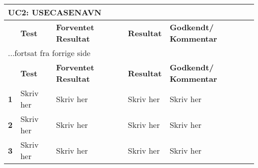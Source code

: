 \begin{center}
	\label{accepttest:uc2} 
\begin{longtable}{|p{}|p{}|p{}|p{}|p{}|} %
\hline
\multicolumn{5}{|l|}{\textbf{UC2: USECASENAVN}} \\ \hline
\multicolumn{1}{|c|}{} &
\textbf{Test} &
\textbf{Forventet \newline Resultat} &
\textbf{Resultat} &
\textbf{Godkendt/ \newline Kommentar} \\ \hline 
\endfirsthead

\multicolumn{5}{l}{...fortsat fra forrige side} \\ \hline 
\multicolumn{1}{|c|}{} &
\textbf{Test} &
\textbf{Forventet \newline Resultat} &
\textbf{Resultat} &
\textbf{Godkendt/ \newline Kommentar} \\ \hline 
\endhead



\textbf{1}	&Skriv her
			&Skriv her
			&Skriv her
			&Skriv her 
			\\\hline

\textbf{2}	&Skriv her
			&Skriv her
			&Skriv her
			&Skriv her 
			\\\hline
			 
\textbf{3}	&Skriv her
			&Skriv her
			&Skriv her
			&Skriv her
			\\\hline

\end{longtable}
\end{center}